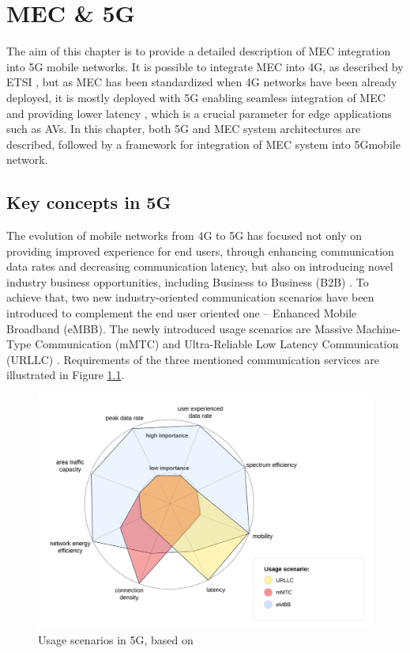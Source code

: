 \documentclass[12pt,a4paper,twoside]{report}
\begin{document}
\chapter{MEC \& 5G}
The aim of this chapter is to provide a detailed description of MEC integration into 5G mobile networks. It is possible to integrate MEC into 4G, as described by ETSI \cite{ETSI:wp24}, but as MEC has been standardized when 4G networks have been already deployed, it is mostly deployed with 5G enabling seamless integration of MEC \cite{ETSI:wp28} and providing lower latency \cite{dahlman-2020-5g}, which is a crucial parameter for edge applications such as AVs.  In this chapter, both 5G and MEC system architectures are described, followed by a framework for integration of MEC system into 5Gmobile network.

\section{Key concepts in 5G}
The evolution of mobile networks from 4G to 5G has focused not only on providing improved experience for end users, through enhancing communication data rates and decreasing communication latency, but also on introducing novel industry business opportunities, including Business to Business (B2B) \cite{rommer20195g}. To achieve that, two new industry-oriented communication scenarios have been introduced to complement the end user oriented one – Enhanced Mobile Broadband (eMBB). The newly introduced usage scenarios are Massive Machine-Type Communication (mMTC) and Ultra-Reliable Low Latency Communication (URLLC) \cite{rommer20195g}. Requirements of the three mentioned communication services are illustrated in Figure \ref{F:usage-scenarios}.
\begin{figure}[ht]
	\centering
	\includegraphics[width=\textwidth]{./images/usage-scenarios.png}
	\caption{Usage scenarios in 5G, based on \cite{dahlman-2020-5g}}
	\label{F:usage-scenarios}
  \end{figure}
\end{document}
